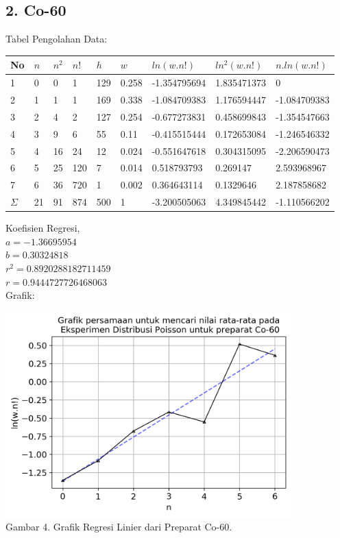 \documentclass{article}
\begin{document}
			\subsection*{2. Co-60}
			Tabel Pengolahan Data: 
			\begin{longtable}{@{}lllllllll@{}}
				\toprule
				No  & $n$  & $n^{2}$ & $n!$   & $h$   & $w$     & $ln(w.n!)$     & $ln^{2}(w.n!)$ & $n.ln(w.n!)$   \\ \midrule
				\endfirsthead
				\endhead
				\bottomrule
				\endfoot
				\endlastfoot
				1   & 0  & 0                    & 1   & 129 & 0.258 & -1.354795694 & 1.835471373                 & 0            \\
				2   & 1  & 1                    & 1   & 169 & 0.338 & -1.084709383 & 1.176594447                 & -1.084709383 \\
				3   & 2  & 4                    & 2   & 127 & 0.254 & -0.677273831 & 0.458699843                 & -1.354547663 \\
				4   & 3  & 9                    & 6   & 55  & 0.11  & -0.415515444 & 0.172653084                 & -1.246546332 \\
				5   & 4  & 16                   & 24  & 12  & 0.024 & -0.551647618 & 0.304315095                 & -2.206590473 \\
				6   & 5  & 25                   & 120 & 7   & 0.014 & 0.518793793  & 0.269147                    & 2.593968967  \\
				7   & 6  & 36                   & 720 & 1   & 0.002 & 0.364643114  & 0.1329646                   & 2.187858682  \\* \midrule
				$\Sigma$ & 21 & 91                   & 874 & 500 & 1     & -3.200505063 & 4.349845442                 & -1.110566202 \\* \bottomrule
			\end{longtable}
			\hspace{-0.6cm}Koefisien Regresi, \\
			$a = -1.36695954$ \\
			$b = 0.30324818$ \\
			$r^{2} = 0.8920288182711459$ \\
			$r = 0.9444727726468063$ \\
			Grafik: 
			\begin{center}
				\includegraphics[width=110mm]{Data/Co-60-Graph.png}\\
				Gambar 4. Grafik Regresi Linier dari Preparat Co-60.
			\end{center}\newpage
\end{document}
